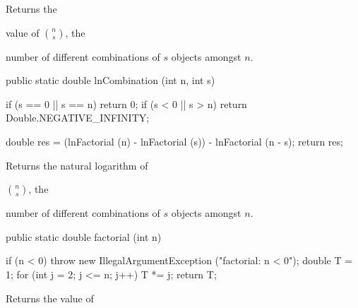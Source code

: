   \begin{tabb} Returns the \begin{latexonly}value of $\binom{n}{s}$, the
   \end{latexonly} number of different combinations
   of $s$ objects amongst $n$. %
 \end{tabb}
 \begin{htmlonly}
 \end{htmlonly}
\begin{code}

   public static double lnCombination (int n, int s)\begin{hide} {
      if (s == 0 || s == n)
         return 0;
      if (s < 0 || s > n)
         return Double.NEGATIVE_INFINITY;

      double res = (lnFactorial (n) - lnFactorial (s)) - lnFactorial (n - s);
      return res;
   }
\end{hide}
\end{code}
  \begin{tabb} Returns the natural logarithm of\begin{latexonly} $\binom{n}{s}$, the
   \end{latexonly} number of different combinations
   of $s$ objects amongst $n$.
 \end{tabb}
 \begin{htmlonly}
 \end{htmlonly}
\begin{code}

   public static double factorial (int n)\begin{hide} {
      if (n < 0)
        throw new IllegalArgumentException ("factorial:   n < 0");
      double T = 1;
      for (int j = 2; j <= n; j++)
         T *= j;
      return T;
   }\end{hide}
\end{code}
 \begin{tabb} Returns the value of
 \end{tabb}
 \begin{htmlonly}
 \end{htmlonly}
